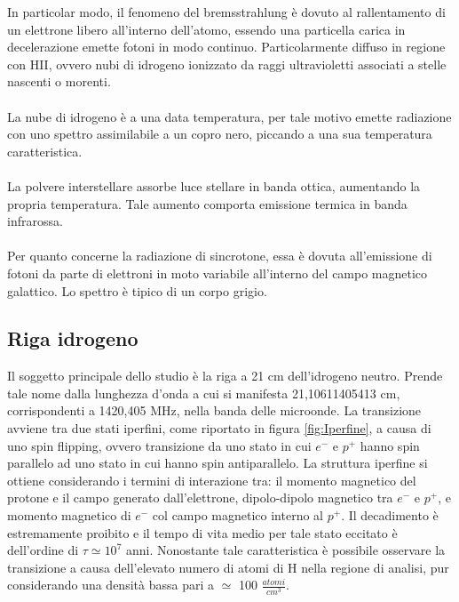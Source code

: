 In particolar modo, il fenomeno del bremsstrahlung è dovuto al rallentamento di un elettrone libero all'interno dell'atomo, essendo una particella carica in decelerazione emette fotoni in modo continuo. Particolarmente diffuso in regione con HII, ovvero nubi di idrogeno ionizzato da raggi ultravioletti associati a stelle nascenti o morenti.
\\\\
La nube di idrogeno è a una data temperatura, per tale motivo emette radiazione con uno spettro assimilabile a un copro nero, piccando a una sua temperatura caratteristica. 
\\\\
La polvere interstellare assorbe luce stellare in banda ottica, aumentando la propria temperatura. Tale aumento comporta emissione termica in banda infrarossa.
\\\\
Per quanto concerne la radiazione di sincrotone, essa è dovuta all'emissione di fotoni da parte di elettroni in moto variabile all'interno del campo magnetico galattico. Lo spettro è tipico di un corpo grigio\cite{Gervasi22:Dispensa}.


\subsection{Riga idrogeno}
Il soggetto principale dello studio è la riga a 21 cm dell'idrogeno neutro. Prende tale nome dalla lunghezza d'onda a cui si manifesta 21,10611405413 cm, corrispondenti a 1420,405 MHz, nella banda delle microonde. La transizione avviene tra due stati iperfini, come riportato in figura \ref{fig:Iperfine}, a causa di uno spin flipping, ovvero transizione da uno stato in cui $e^{-}$ e $p^{+}$ hanno spin parallelo ad uno stato in cui hanno spin antiparallelo. La struttura iperfine si ottiene considerando i termini di interazione tra: il momento magnetico del protone e il campo generato dall'elettrone, dipolo-dipolo magnetico tra $e^{-}$ e $p^{+}$, e momento magnetico di $e^{-}$ col campo magnetico interno al $p^{+}$\cite{Cohen:libro}.
Il decadimento è estremamente proibito e il tempo di vita medio per tale stato eccitato è dell'ordine di $\tau \simeq 10 ^{7}$  anni\cite{Mhaske:articolo}.
Nonostante tale caratteristica è possibile osservare la transizione  a causa dell'elevato numero di atomi di H nella regione di analisi, pur considerando una densità bassa pari a $\simeq$ 100 $\frac{atomi}{cm^{3}}$. 


